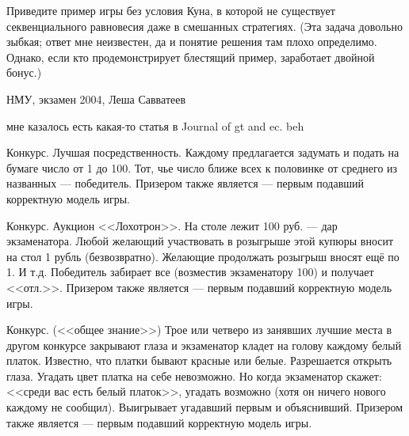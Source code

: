 \begin{problem}
 Приведите пример игры без условия Куна, в которой не существует секвенциального равновесия даже в смешанных стратегиях. (Эта задача довольно зыбкая; ответ мне неизвестен, да и понятие решения там плохо определимо. Однако, если кто продемонстрирует блестящий пример, заработает двойной бонус.)



\begin{source}
НМУ, экзамен 2004, Леша Савватеев
\end{source}


\begin{sol}
мне казалось есть какая-то статья в Journal of gt and ec. beh
\end{sol}
\end{problem}







\begin{problem}
Конкурс. Лучшая посредственность. Каждому предлагается задумать и подать на
бумаге число от 1 до 100. Тот, чье число ближе всех
к половинке от среднего из названных --- победитель.
Призером также является --- первым подавший
корректную модель игры.



\begin{sol}

\end{sol}
\end{problem}




\begin{problem}
 Конкурс. Аукцион <<Лохотрон>>. На столе лежит 100 руб. --- дар
экзаменатора. Любой желающий участвовать в
розыгрыше этой купюры вносит на стол 1 рубль
(безвозвратно). Желающие продолжать розыгрыш вносят
ещё по 1. И т.д. Победитель забирает все (возместив
экзаменатору 100) и получает <<отл.>>. Призером также
является --- первым подавший корректную модель игры.



\begin{sol}

\end{sol}
\end{problem}



\begin{problem}
 Конкурс. (<<общее знание>>) Трое или четверо из
занявших лучшие места в другом конкурсе закрывают
глаза и экзаменатор кладет на голову каждому белый
платок. Известно, что платки бывают красные или
белые. Разрешается открыть глаза. Угадать цвет
платка на себе невозможно. Но когда экзаменатор
скажет: <<среди вас есть белый платок>>, угадать
возможно (хотя он ничего нового каждому не
сообщил). Выигрывает угадавший первым и объяснивший.
Призером также является --- первым подавший
корректную модель игры.



\begin{sol}

\end{sol}
\end{problem}
